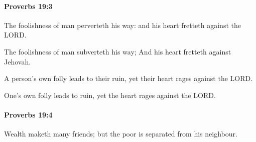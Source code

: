 		\paragraph{Proverbs 19:3} %
			\label{PROVERBS-19-3}

			The foolishness of man perverteth his way: and his heart fretteth against the LORD.

			\begin{versebox}
					\item[BHS] 
					\item[ASV] The foolishness of man subverteth his way; And his heart fretteth against Jehovah.
					\item[NIV] A person’s own folly leads to their ruin, yet their heart rages against the LORD.
					\item[NRSV] One’s own folly leads to ruin, yet the heart rages against the LORD.
			\end{versebox}

		\paragraph{Proverbs 19:4} %
			\label{PROVERBS-19-4}

			Wealth maketh many friends; but the poor is separated from his neighbour.

